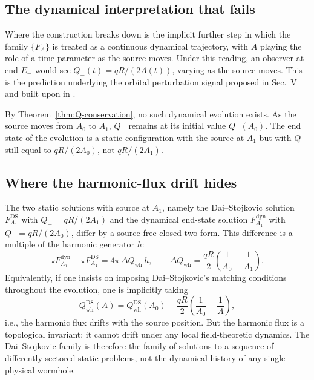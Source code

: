 \documentclass[aps,prd,onecolumn,nofootinbib,superscriptaddress]{revtex4-2}
\begin{document}
\subsection{The dynamical interpretation that fails}

Where the construction breaks down is the implicit further step in which the family $\{F_A\}$ is treated as a continuous dynamical trajectory, with $A$ playing the role of a time parameter as the source moves. Under this reading, an observer at end $E_-$ would see $Q_-(t) = qR/(2A(t))$, varying as the source moves. This is the prediction underlying the orbital perturbation signal proposed in \cite{DaiStojkovic2019Observing} Sec.~V and built upon in \cite{SimonettiEtAl2021SensitiveSearches}.

By Theorem~\ref{thm:Q-conservation}, no such dynamical evolution exists. As the source moves from $A_0$ to $A_1$, $Q_-$ remains at its initial value $Q_-(A_0)$. The end state of the evolution is a static configuration with the source at $A_1$ but with $Q_-$ still equal to $qR/(2A_0)$, not $qR/(2A_1)$.

\subsection{Where the harmonic-flux drift hides}

The two static solutions with source at $A_1$, namely the Dai--Stojkovic solution $F_{A_1}^{\mathrm{DS}}$ with $Q_- = qR/(2A_1)$ and the dynamical end-state solution $F_{A_1}^{\mathrm{dyn}}$ with $Q_- = qR/(2A_0)$, differ by a source-free closed two-form. This difference is a multiple of the harmonic generator $h$:
\begin{equation}
\star F_{A_1}^{\mathrm{dyn}} - \star F_{A_1}^{\mathrm{DS}} = 4\pi\,\Delta Q_{\mathrm{wh}}\, h, \qquad
\Delta Q_{\mathrm{wh}} = \frac{qR}{2}\!\left(\frac{1}{A_0}-\frac{1}{A_1}\right).
\end{equation}
Equivalently, if one insists on imposing Dai--Stojkovic's matching conditions throughout the evolution, one is implicitly taking
\begin{equation}
Q_{\mathrm{wh}}^{\mathrm{DS}}(A) = Q_{\mathrm{wh}}^{\mathrm{DS}}(A_0) - \frac{qR}{2}\!\left(\frac{1}{A_0}-\frac{1}{A}\right),
\end{equation}
i.e., the harmonic flux drifts with the source position. But the harmonic flux is a topological invariant; it cannot drift under any local field-theoretic dynamics. The Dai--Stojkovic family is therefore the family of solutions to a sequence of differently-sectored static problems, not the dynamical history of any single physical wormhole.
\end{document}
